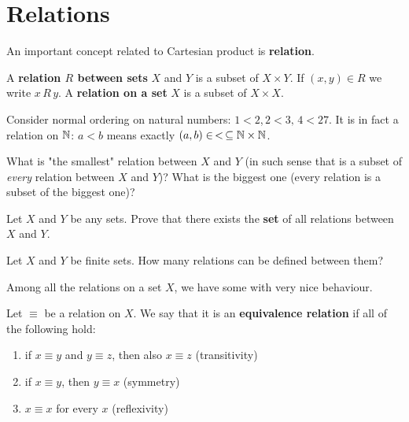 \section{Relations}
An important concept related to Cartesian product is \textbf{relation}.

\begin{definition}
  A \textbf{relation $R$ between sets} $X$ and $Y$ is a subset of $X\times Y$. If $(x,y)\in R$ we write $x\,R\,y$. A \textbf{relation on a set} $X$ is a subset of $X\times X$.
\end{definition}

\begin{example}
  Consider normal ordering on natural numbers: $1<2$,\,$2<3,\, 4<27$. It is in fact a relation on $\mathbb N$: $a<b$ means exactly $(a,b)\in\, <\,\subseteq \mathbb N\times \mathbb N$.
\end{example}

\begin{exercise}
  What is "the smallest" relation between $X$ and $Y$ (in such sense that is a subset of \emph{every} relation between $X$ and $Y$)? What is the biggest one (every relation is a subset of the biggest one)?
\end{exercise}

\begin{exercise}
 Let $X$ and $Y$ be any sets. Prove that there exists the \textbf{set} of all relations between $X$ and $Y$.
\end{exercise}

\begin{exercise}
  Let $X$ and $Y$ be finite sets. How many relations can be defined between them?
\end{exercise}

Among all the relations on a set $X$, we have some with very nice behaviour.

\begin{definition}
  Let $\equiv$ be a relation on $X$. We say that it is an \textbf{equivalence relation} if all of the following hold:
  \begin{enumerate}
    \item if $x\equiv y$ and $y\equiv z$, then also $x\equiv z$ (transitivity)
    \item if $x\equiv y$, then $y\equiv x$ (symmetry)
    \item $x\equiv x$ for every $x$ (reflexivity)
  \end{enumerate}
\end{definition}

